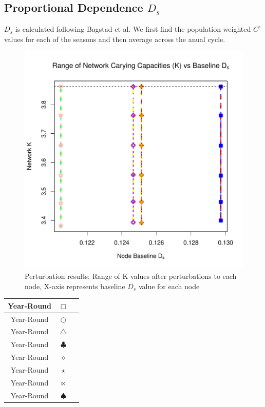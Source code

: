 \documentclass[10pt]{article}
\begin{document}
\newpage
\subsection{Proportional Dependence \texorpdfstring{$D_s$}{DS}}

$D_s$ is calculated following Bagstad et al. We first find the population weighted $C^r$ values for each of the seasons and then average across the anual cycle.


\vspace{-.5cm}
\begin{figure}[H]
\begin{center}
\includegraphics[width=.8\textwidth, height=.8\textwidth]{RGraphics-plant_barcr_DS}
\caption{Perturbation results: Range of K values after perturbations to each node, X-axis represents baseline $D_s$ value for each node}\label{fig:plant_barcr_DS}
\end{center}
\end{figure}

\vspace{-.5cm}
\begin{tabular}{|c|c|c|}
\hline
{\color{red} Year-Round} & $\Box$ & \\
\hline
{\color{green} Year-Round} & $\bigcirc$ & \\
\hline
{\color{yellow} Year-Round} & $\triangle$ & \\
\hline
{\color{brown} Year-Round} & $\clubsuit$ & \\
\hline
{\color{orange} Year-Round} & $\diamond$ & \\
\hline
{\color{purple} Year-Round} & $\star$ & \\
\hline
{\color{pink} Year-Round} & $\bowtie$ & \\
\hline
{\color{blue} Year-Round} & $\spadesuit$ \\
\hline
\end{tabular}
\end{document}
